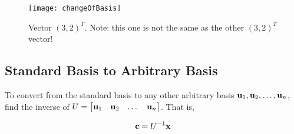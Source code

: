 

 
\begin{figure}[htbp] %
   \centering
   \texttt{[image: changeOfBasis]} 
   \caption{Vector $(3,2)^T$.  Note: this one is not the same as the other $(3,2)^T$ vector!}

   \label{fig:example}
\end{figure}
 



 \subsection*{Standard  Basis to Arbitrary  Basis}
To convert from the standard basis to any other arbitrary basis ${\bf u}_1, {\bf u}_2, \dots,  {\bf u}_n$, find the inverse of $U = \begin{bmatrix}{\bf u}_1 &	{\bf u}_2 	& \dots & {\bf u}_n \end{bmatrix}$.  That is, 

\[ {\bf c} = U^{-1} {\bf x} \]   



